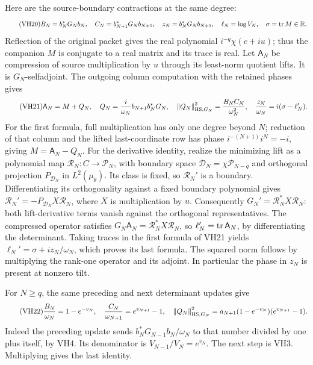 \documentclass[11pt]{article}
\begin{document}
Here are the source-boundary contractions at the same degree:
\begin{equation}\tag{VH20}\label{hvh:VH20}
B_N=b_N^*G_Nb_N,\quad C_N=b_{N+1}^*G_Nb_{N+1},\quad
z_N=b_N^*G_Nb_{N+1},\quad
\ell_N=\log V_N,\quad \sigma=\operatorname{tr} M\in\mathbb R.
\end{equation}
Reflection of the original packet gives the real polynomial
\(i^{-q}\chi(c+iu)\); thus the companion \(M\) is conjugate to a real
matrix and its trace is real. Let \(\mathsf A_N\) be compression of
source multiplication by \(u\) through its least-norm quotient lifts.
It is \(G_N\)-selfadjoint. The outgoing column computation with the
retained phases gives
\begin{equation}\tag{VH21}\label{hvh:VH21}
\mathsf A_N=M+Q_N,\quad
Q_N=\frac{i}{\omega_N}b_{N+1}b_N^*G_N,\quad
\left\lVert Q_N\right\rVert_{\mathrm{HS},G_N}^2=\frac{B_NC_N}{\omega_N^2},\quad
\frac{z_N}{\omega_N}=i(\sigma-\ell_N').
\end{equation}
For the first formula, full multiplication has only one degree beyond
\(N\); reduction of that column and the lifted last-coordinate row
has phase \(i^{-(N+1)}i^N=-i\), giving \(M=\mathsf A_N-Q_N\).
For the derivative identity, realize the minimizing lift as a polynomial
map \(\mathcal R_N:C\to\mathcal P_N\), with boundary space
\(\mathcal D_N=\chi\mathcal P_{N-q}\) and orthogonal projection
\(P_{\mathcal D_N}\) in \(L^2(\mu_\theta)\). Its class is fixed, so
\(\mathcal R_N'\) is a boundary. Differentiating its orthogonality
against a fixed boundary polynomial gives
\(\mathcal R_N'=-P_{\mathcal D_N}X\mathcal R_N\), where \(X\) is
multiplication by \(u\). Consequently
\(G_N'=\mathcal R_N^*X\mathcal R_N\): both lift-derivative terms vanish
against the orthogonal representatives. The compressed operator satisfies
\(G_N\mathsf A_N=\mathcal R_N^*X\mathcal R_N\), so
\(\ell_N'=\operatorname{tr}\mathsf A_N\), by differentiating the determinant.
Taking traces in the first formula of VH21 yields
\(\ell_N'=\sigma+i z_N/\omega_N\), which proves its last formula.
The squared norm follows by multiplying the rank-one operator and its
adjoint. In particular the phase in \(z_N\) is present at nonzero tilt.

For \(N\ge q\), the same preceding and next determinant updates give
\begin{equation}\tag{VH22}\label{hvh:VH22}
\frac{B_N}{\omega_N}=1-e^{-v_N},\quad
\frac{C_N}{\omega_{N+1}}=e^{v_{N+1}}-1,\quad
\left\lVert Q_N\right\rVert_{\mathrm{HS},G_N}^2
=a_{N+1}(1-e^{-v_N})(e^{v_{N+1}}-1).
\end{equation}
Indeed the preceding update sends
\(b_N^*G_{N-1}b_N/\omega_N\) to that number divided by one plus itself,
by VH4. Its denominator is \(V_{N-1}/V_N=e^{v_N}\).
The next step is VH3. Multiplying gives the last identity.
\end{document}
